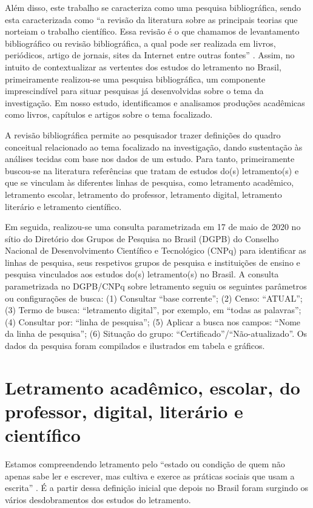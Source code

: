 \documentclass{textolivre}
\begin{document}
Além disso, este trabalho se caracteriza como uma pesquisa bibliográfica, sendo esta caracterizada como “a revisão da literatura sobre as principais teorias que norteiam o trabalho científico. Essa revisão é o que chamamos de levantamento bibliográfico ou revisão bibliográfica, a qual pode ser realizada em livros, periódicos, artigo de jornais, sites da Internet entre outras fontes” \cite[p. 54]{pizzani_arte_2012}. Assim, no intuito de contextualizar as vertentes dos estudos do letramento no Brasil, primeiramente realizou-se uma pesquisa bibliográfica, um componente imprescindível para situar pesquisas já desenvolvidas sobre o tema da investigação. Em nosso estudo, identificamos e analisamos produções acadêmicas como livros, capítulos e artigos sobre o tema focalizado. 

A revisão bibliográfica permite ao pesquisador trazer definições do quadro conceitual relacionado ao tema focalizado na investigação, dando sustentação às análises tecidas com base nos dados de um estudo. Para tanto, primeiramente buscou-se na literatura referências que tratam de estudos do(s) letramento(s) e que se vinculam às diferentes linhas de pesquisa, como letramento acadêmico, letramento escolar, letramento do professor, letramento digital, letramento literário e letramento científico.

Em seguida, realizou-se uma consulta parametrizada em 17 de maio de 2020 no sítio do Diretório dos Grupos de Pesquisa no Brasil (DGPB) do Conselho Nacional de Desenvolvimento Científico e Tecnológico (CNPq) para identificar as linhas de pesquisa, seus respetivos grupos de pesquisa e instituições de ensino e pesquisa vinculados aos estudos do(s) letramento(s) no Brasil. A consulta parametrizada no DGPB/CNPq sobre letramento seguiu os seguintes parâmetros ou configurações de busca: (1) Consultar “base corrente”; (2) Censo: “ATUAL”; (3) Termo de busca: “letramento digital”, por exemplo, em “todas as palavras”; (4) Consultar por: “linha de pesquisa”; (5) Aplicar a busca nos campos: “Nome da linha de pesquisa”; (6) Situação do grupo: “Certificado”/“Não-atualizado”. Os dados da pesquisa foram compilados e ilustrados em tabela e gráficos.

\section{Letramento acadêmico, escolar, do professor, digital, literário e científico}\label{sec-alfabetizacion}
Estamos compreendendo letramento pelo “estado ou condição de quem não apenas sabe ler e escrever, mas cultiva e exerce as práticas sociais que usam a escrita” \cite[p. 47]{soares_escolarizacao_1999}.  É a partir dessa definição inicial que depois no Brasil foram surgindo os vários desdobramentos dos estudos do letramento.
\end{document}
